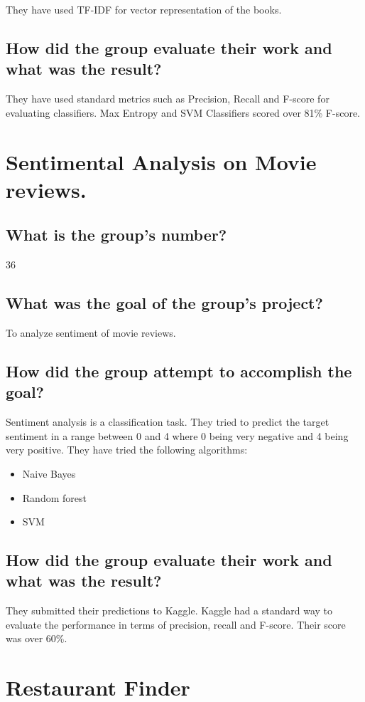 \documentclass[letterpaper]{article}
\begin{document}
They have used TF-IDF for vector representation of the books.

\subsection{How did the group evaluate their work and what was the result?}
They have used standard metrics such as Precision, Recall and F-score for evaluating classifiers.
Max Entropy and SVM Classifiers scored over 81\% F-score.


\section{Sentimental Analysis on Movie reviews.}
\subsection{What is the group's number?}
36
\subsection{What was the goal of the group's project?}
To analyze sentiment of movie reviews.
\subsection{How did the group attempt to accomplish the goal?}
Sentiment analysis is a classification task. They tried to predict the target sentiment in a range between 0 and 4 where 0 being very negative and 4 being very positive. They have tried the following algorithms:
\begin{itemize}
	\item Naive Bayes
	\item Random forest
	\item  SVM
\end{itemize}

\subsection{How did the group evaluate their work and what was the result?}
They submitted their predictions to Kaggle. Kaggle had a standard way to evaluate the performance in terms of precision, recall and F-score. Their score was over 60\%.



\section{Restaurant Finder }
\end{document}
